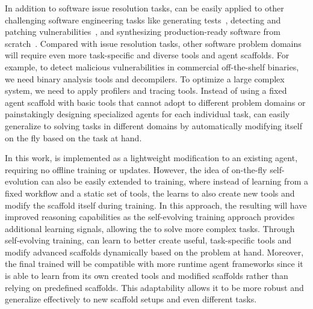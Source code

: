 In addition to software issue resolution tasks, \tech can be easily applied to other challenging software engineering tasks like generating tests~\cite{deng2023large}, detecting and patching vulnerabilities~\cite{lee2025sec}, and synthesizing production-ready software from scratch~\cite{zhao2024commit0}.
Compared with issue resolution tasks, other software problem domains will require even more task-specific and diverse tools and agent scaffolds.
For example, to detect malicious vulnerabilities in commercial off-the-shelf binaries, we need binary analysis tools and decompilers. 
To optimize a large complex system, we need to apply profilers and tracing tools.
Instead of using a fixed agent scaffold with basic tools that cannot adopt to different problem domains or painstakingly designing specialized agents for each individual task, \tech can easily generalize to solving tasks in different domains by automatically modifying itself on the fly based on the task at hand.

In this work, \tech is implemented as a lightweight modification to an existing agent, requiring no offline training or updates.
However, the idea of on-the-fly self-evolution can also be easily extended to \llm training, where instead of learning from a fixed workflow and a static set of tools, the \llm learns to also create new tools and modify the scaffold itself during training. 
In this approach, the resulting \llm will have improved reasoning capabilities as the self-evolving training approach provides additional learning signals, allowing the \llm to solve more complex tasks. 
Through self-evolving training,  can learn to better create useful, task-specific tools and modify advanced scaffolds dynamically based on the problem at hand. 
Moreover, the final trained \llm will be compatible with more runtime agent frameworks since it is able to learn from its own created tools and modified scaffolds rather than relying on predefined scaffolds. 
This adaptability allows it to be more robust and generalize effectively to new scaffold setups and
even different tasks.

